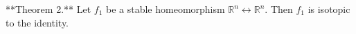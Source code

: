**Theorem 2.** Let $f_1$ be a stable homeomorphism $\mathbb{R}^n \leftrightarrow \mathbb{R}^n$. Then $f_1$ is isotopic to the identity.
